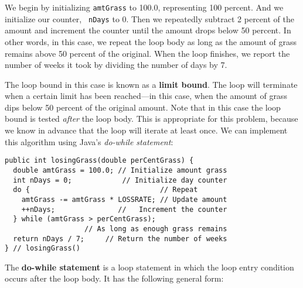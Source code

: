 \noindent We begin by initializing {\tt amtGrass} to
100.0, representing 100 percent. And we initialize our counter, {\tt
nDays} to 0. Then we repeatedly subtract 2 percent of the amount and
increment the counter until the amount drops below 50 percent. In
other words, in this case, we repeat the loop body as long as the
amount of grass remains above 50 percent of the original. When the
loop finishes, we report the number of weeks it took by dividing the
number of days by 7.

The loop bound in this case is known as a {\bf limit bound}. The loop
will terminate when a certain limit has been reached---in this case,
when the amount of grass dips below 50 percent of the original amount.
Note that in this case the loop bound is tested {\it after} the loop
body. This is appropriate for this problem, because we know in advance
that the loop will iterate at least once. We can implement this
algorithm using Java's {\it do-while statement}:

\begin{jjjlisting}
\begin{lstlisting}
public int losingGrass(double perCentGrass) {
  double amtGrass = 100.0; // Initialize amount grass
  int nDays = 0;            // Initialize day counter
  do {                               // Repeat
    amtGrass -= amtGrass * LOSSRATE; // Update amount
    ++nDays;               //   Increment the counter
  } while (amtGrass > perCentGrass);   
                   // As long as enough grass remains
  return nDays / 7;     // Return the number of weeks
} // losingGrass()
\end{lstlisting}
\end{jjjlisting}

\noindent The {\bf do-while statement} is a loop statement in which the loop
entry condition occurs after the loop body. It has the following
general form:


